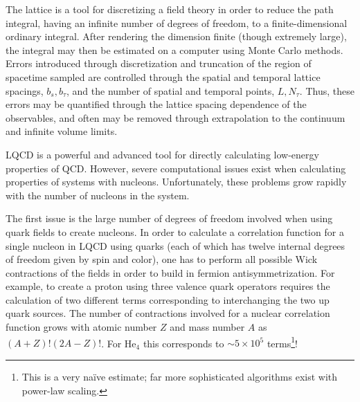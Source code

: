 The lattice is a tool for discretizing a field theory in order to reduce the path integral, having an infinite number of degrees of freedom, to a finite-dimensional ordinary integral. After rendering the dimension finite (though extremely large), the integral may then be estimated on a computer using Monte Carlo methods. Errors introduced through discretization and truncation of the region of spacetime sampled are controlled through the spatial and temporal lattice spacings, $b_s,b_{\tau}$, and the number of spatial and temporal points, $L,N_{\tau}$. Thus, these errors may be quantified through the lattice spacing dependence of the observables, and often may be removed through extrapolation to the continuum and infinite volume limits.

LQCD is a powerful and advanced tool for directly calculating low-energy properties of QCD. However, severe computational issues exist when calculating properties of systems with nucleons. Unfortunately, these problems grow rapidly with the number of nucleons in the system. 

The first issue is the large number of degrees of freedom involved when using quark fields to create nucleons. In order to calculate a correlation function for a single nucleon in LQCD using quarks (each of which has twelve internal degrees of freedom given by spin and color), one has to perform all possible Wick contractions of the fields in order to build in fermion antisymmetrization. For example, to create a proton using three valence quark operators requires the calculation of two different terms corresponding to interchanging the two up quark sources. The number of contractions involved for a nuclear correlation function grows with atomic number $Z$ and mass number $A$ as $(A+Z)!(2A-Z)!$. For He$_4$ this corresponds to $\sim 5 \times 10^5$ terms\footnote{This is a very na\"ive estimate; far more sophisticated algorithms exist with power-law scaling.}!

